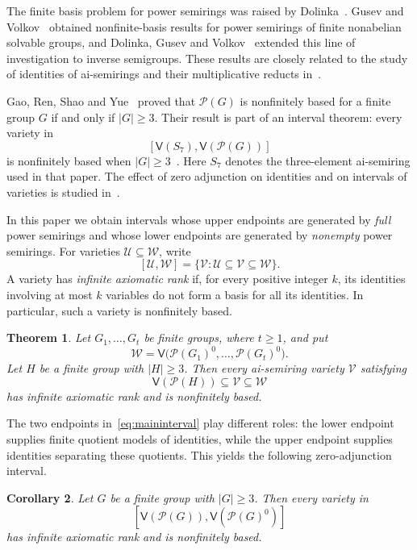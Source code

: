 \documentclass[11pt,reqno]{amsart}
\newtheorem{theorem}{Theorem}[section]
\newtheorem{corollary}[theorem]{Corollary}
\theoremstyle{definition}
\numberwithin{equation}{section}
\newcommand{\Pow}{\mathcal{P}}
\newcommand{\Full}[1]{\mathcal{P}(#1)^0}
\newcommand{\Var}{\mathsf{V}}
\newcommand{\calU}{\mathcal{U}}
\newcommand{\calV}{\mathcal{V}}
\newcommand{\calW}{\mathcal{W}}
\renewcommand{\geq}{\geqslant}
\begin{document}
The finite basis problem for power semirings was raised by Dolinka~\cite{d}. Gusev and Volkov~\cite{gv} obtained nonfinite-basis results for power semirings of finite nonabelian solvable groups, and Dolinka, Gusev and Volkov~\cite{dgv} extended this line of investigation to inverse semigroups. These results are closely related to the study of identities of ai-semirings and their multiplicative reducts in~\cite{jrz}.

Gao, Ren, Shao and Yue~\cite{grsy} proved that $\Pow(G)$ is nonfinitely based for a finite group $G$ if and only if $|G|\geq 3$. Their result is part of an interval theorem: every variety in
\[
 [\Var(S_7),\Var(\Pow(G))]
\]
is nonfinitely based when $|G|\geq 3$~\cite[Corollary~3.5]{grsy}. Here $S_7$ denotes the three-element ai-semiring used in that paper. The effect of zero adjunction on identities and on intervals of varieties is studied in~\cite{wrz,grz}.

In this paper we obtain intervals whose upper endpoints are generated by \emph{full} power semirings and whose lower endpoints are generated by \emph{nonempty} power semirings. For varieties $\calU\subseteq\calW$, write
\[
 [\calU,\calW]=\{\calV:\calU\subseteq\calV\subseteq\calW\}.
\]
A variety has \emph{infinite axiomatic rank} if, for every positive integer $k$, its identities involving at most $k$ variables do not form a basis for all its identities. In particular, such a variety is nonfinitely based.

\begin{theorem}\label{thm:interval}
Let $G_1,\ldots,G_t$ be finite groups, where $t\geq 1$, and put
\[
 \calW=\Var\bigl(\Full{G_1},\ldots,\Full{G_t}\bigr).
\]
Let $H$ be a finite group with $|H|\geq 3$. Then every ai-semiring variety $\calV$ satisfying
\begin{equation}\label{eq:maininterval}
 \Var(\Pow(H))\subseteq\calV\subseteq\calW
\end{equation}
has infinite axiomatic rank and is nonfinitely based.
\end{theorem}

The two endpoints in~\eqref{eq:maininterval} play different roles: the lower endpoint supplies finite quotient models of identities, while the upper endpoint supplies identities separating these quotients. This yields the following zero-adjunction interval.

\begin{corollary}\label{cor:zerointerval}
Let $G$ be a finite group with $|G|\geq 3$. Then every variety in
\[
 [\Var(\Pow(G)),\Var(\Full{G})]
\]
has infinite axiomatic rank and is nonfinitely based.
\end{corollary}
\end{document}
